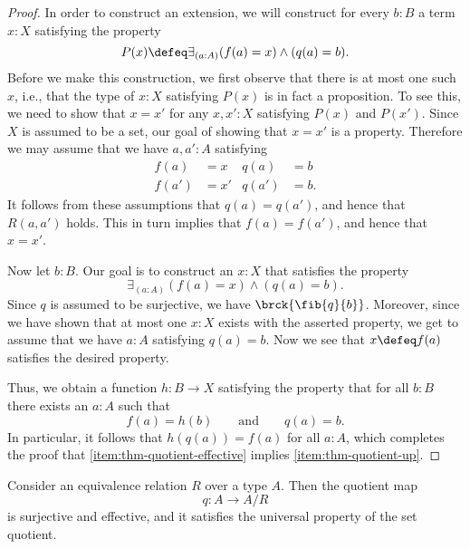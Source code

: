 \begin{proof}
  In order to construct an extension, we will construct for every $b:B$ a term $x:X$ satisfying the property
  \begin{equation*}
    P(x)\defeq \exists_{(a:A)}(f(a)=x)\land (q(a)=b).
  \end{equation*}
  Before we make this construction, we first observe that there is at most one such $x$, i.e., that the type of $x:X$ satisfying $P(x)$ is in fact a proposition. To see this, we need to show that $x=x'$ for any $x,x':X$ satisfying $P(x)$ and $P(x')$. Since $X$ is assumed to be a set, our goal of showing that $x=x'$ is a property. Therefore we may assume that we have $a,a':A$ satisfying
  \begin{align*}
    f(a) & = x & q(a) & = b \\
    f(a') & = x' & q(a') & = b.
  \end{align*}
  It follows from these assumptions that $q(a)=q(a')$, and hence that $R(a,a')$ holds. This in turn implies that $f(a)=f(a')$, and hence that $x=x'$.

  Now let $b:B$. Our goal is to construct an $x:X$ that satisfies the property
  \begin{equation*}
    \exists_{(a:A)}(f(a)=x)\land (q(a)=b).
  \end{equation*}
  Since $q$ is assumed to be surjective, we have $\brck{\fib{q}{b}}$. Moreover, since we have shown that at most one $x:X$ exists with the asserted property, we get to assume that we have $a:A$ satisfying $q(a)=b$. Now we see that $x\defeq f(a)$ satisfies the desired property.

  Thus, we obtain a function $h:B\to X$ satisfying the property that for all $b:B$ there exists an $a:A$ such that
  \begin{equation*}
    f(a)=h(b)\qquad\text{and}\qquad q(a)=b.
  \end{equation*}
  In particular, it follows that $h(q(a))=f(a)$ for all $a:A$, which completes the proof that \ref{item:thm-quotient-effective} implies \ref{item:thm-quotient-up}.  
\end{proof}

\begin{cor}
  Consider an equivalence relation $R$ over a type $A$. Then the quotient map
  \begin{equation*}
    q:A\to A/R
  \end{equation*}
  is surjective and effective, and it satisfies the universal property of the set quotient.
\end{cor}

